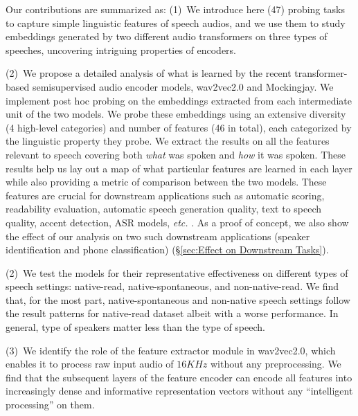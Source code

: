 \documentclass[sigconf]{acmart}
\newcommand{\wv}{wav2vec2.0\xspace}
\newcommand{\mj}{Mockingjay\xspace}
\begin{document}
Our contributions are summarized as: 
(1)~We introduce here (47) probing tasks to capture simple linguistic features of speech audios, and we use them to study embeddings generated by two different audio transformers on three types of speeches, uncovering intriguing properties of encoders.

(2)~We propose a detailed analysis of what is learned by the recent transformer-based semisupervised audio encoder models, {\wv} and {\mj}. We implement post hoc probing on the embeddings extracted from each intermediate unit of the two models. We probe these embeddings using an extensive diversity (4 high-level categories) and number of features (46 in total), each categorized by the linguistic property they probe. 
We extract the results on all the features relevant to speech covering both \textit{what} was spoken and \textit{how} it was spoken. These results help us lay out a map of what particular features are learned in each layer while also providing a metric of comparison between the two models. These features are crucial for downstream applications such as automatic scoring, readability evaluation, automatic speech generation quality, text to speech quality, accent detection, ASR models, \textit{etc.} \cite{yan2018complexity,barth2014effects,rasinski2004assessing,zhang2019learning,kyriakopoulos2020automatic,jyothi2015improved}. As a proof of concept, we also show the effect of our analysis on two such downstream applications (speaker identification and phone classification) (\S\ref{sec:Effect on Downstream Tasks}).


(2)~We test the models for their representative effectiveness on different types of speech settings: native-read, native-spontaneous, and non-native-read. We find that, for the most part, native-spontaneous and non-native speech settings follow the result patterns for native-read dataset albeit with a worse performance. In general, type of speakers matter less than the type of speech. %


(3)~We identify the role of the feature extractor module in wav2vec2.0, which enables it to process raw input audio of $16 KHz$ without any preprocessing. We find that the subsequent layers of the feature encoder can encode all features into increasingly dense and informative representation vectors without any ``intelligent processing'' on them. 
\end{document}

